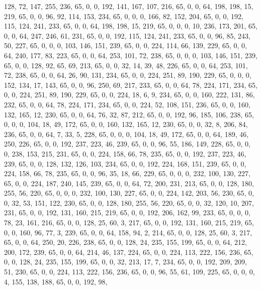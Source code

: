 \begin{DoxyCode}
       128, 72, 147, 255, 236, 65, 0, 0, 192, 141, 167, 107, 216, 65, 0, 0, 64, 198, 198, 15, 219, 65, 0, 0, 96,
       92, 114, 153, 234, 65, 0, 0, 0, 166, 82, 152, 204, 65, 0, 0, 192, 115, 124, 241, 233, 65, 0, 0, 64, 198, 198,
       15, 219, 65, 0, 0, 0, 10, 236, 173, 201, 65, 0, 0, 64, 247, 246, 61, 231, 65, 0, 0, 192, 115, 124, 241,
       233, 65, 0, 0, 96, 85, 243, 50, 227, 65, 0, 0, 0, 103, 146, 151, 239, 65, 0, 0, 224, 114, 66, 139, 229, 65, 0,
       0, 64, 240, 177, 83, 223, 65, 0, 0, 64, 253, 101, 72, 238, 65, 0, 0, 0, 103, 146, 151, 239, 65, 0, 0, 128,
       92, 65, 69, 213, 65, 0, 0, 32, 14, 39, 48, 226, 65, 0, 0, 64, 253, 101, 72, 238, 65, 0, 0, 64, 26, 90, 131,
       234, 65, 0, 0, 224, 251, 89, 190, 229, 65, 0, 0, 0, 152, 134, 17, 143, 65, 0, 0, 96, 250, 69, 217, 233, 65,
       0, 0, 64, 78, 224, 171, 234, 65, 0, 0, 224, 251, 89, 190, 229, 65, 0, 0, 224, 18, 6, 9, 234, 65, 0, 0, 160,
       222, 131, 86, 232, 65, 0, 0, 64, 78, 224, 171, 234, 65, 0, 0, 224, 52, 108, 151, 236, 65, 0, 0, 160, 132,
       165, 12, 230, 65, 0, 0, 64, 76, 32, 87, 212, 65, 0, 0, 192, 96, 185, 106, 238, 65, 0, 0, 0, 104, 18, 49, 172,
       65, 0, 0, 160, 132, 165, 12, 230, 65, 0, 0, 32, 8, 206, 84, 236, 65, 0, 0, 64, 7, 33, 5, 228, 65, 0, 0, 0,
       104, 18, 49, 172, 65, 0, 0, 64, 189, 46, 250, 226, 65, 0, 0, 192, 237, 223, 46, 239, 65, 0, 0, 96, 55, 186,
       149, 228, 65, 0, 0, 0, 238, 153, 215, 231, 65, 0, 0, 224, 158, 66, 78, 235, 65, 0, 0, 192, 237, 223, 46, 239,
       65, 0, 0, 128, 132, 126, 103, 234, 65, 0, 0, 192, 224, 168, 151, 239, 65, 0, 0, 224, 158, 66, 78, 235, 65,
       0, 0, 96, 35, 18, 66, 229, 65, 0, 0, 0, 232, 100, 130, 227, 65, 0, 0, 224, 187, 240, 145, 239, 65, 0, 0, 64,
       72, 200, 231, 213, 65, 0, 0, 128, 180, 255, 56, 220, 65, 0, 0, 0, 232, 100, 130, 227, 65, 0, 0, 224, 142,
       203, 56, 230, 65, 0, 0, 32, 53, 151, 122, 230, 65, 0, 0, 128, 180, 255, 56, 220, 65, 0, 0, 32, 120, 10, 207,
       231, 65, 0, 0, 192, 131, 160, 215, 219, 65, 0, 0, 192, 206, 162, 99, 233, 65, 0, 0, 0, 78, 23, 161, 216, 65,
       0, 0, 128, 25, 60, 3, 217, 65, 0, 0, 192, 131, 160, 215, 219, 65, 0, 0, 160, 96, 77, 3, 239, 65, 0, 0, 64,
       158, 94, 2, 214, 65, 0, 0, 128, 25, 60, 3, 217, 65, 0, 0, 64, 250, 20, 226, 238, 65, 0, 0, 128, 24, 235, 155,
       199, 65, 0, 0, 64, 212, 200, 172, 239, 65, 0, 0, 64, 214, 46, 137, 224, 65, 0, 0, 224, 113, 222, 156, 236,
       65, 0, 0, 128, 24, 235, 155, 199, 65, 0, 0, 32, 213, 17, 7, 234, 65, 0, 0, 192, 209, 209, 51, 230, 65, 0, 0,
       224, 113, 222, 156, 236, 65, 0, 0, 96, 55, 61, 109, 225, 65, 0, 0, 0, 4, 155, 138, 188, 65, 0, 0, 192, 98,

\end{DoxyCode}
